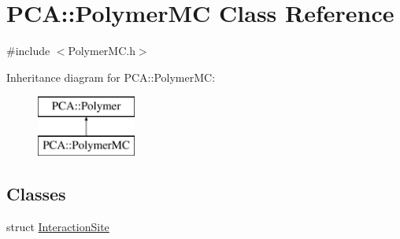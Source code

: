 \hypertarget{class_p_c_a_1_1_polymer_m_c}{}\section{P\+CA\+:\+:Polymer\+MC Class Reference}
\label{class_p_c_a_1_1_polymer_m_c}


{\ttfamily \#include $<$Polymer\+M\+C.\+h$>$}

Inheritance diagram for P\+CA\+:\+:Polymer\+MC\+:\begin{figure}[H]
\begin{center}
\leavevmode
\includegraphics[height=2.000000cm]{class_p_c_a_1_1_polymer_m_c}
\end{center}
\end{figure}
\subsection*{Classes}
\begin{DoxyCompactItemize}
\item 
struct \hyperlink{struct_p_c_a_1_1_polymer_m_c_1_1_interaction_site}{Interaction\+Site}
\end{DoxyCompactItemize}
